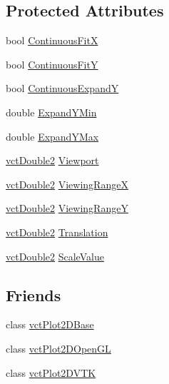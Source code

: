 \subsection*{Protected Attributes}
\begin{DoxyCompactItemize}
\item 
bool \hyperlink{classvct_plot2_d_base_1_1_scale_af427cb10aa8954351e39f21ad9b03b31}{Continuous\-Fit\-X}
\item 
bool \hyperlink{classvct_plot2_d_base_1_1_scale_a2458a3a97a0362e8abbb253bffaf1e02}{Continuous\-Fit\-Y}
\item 
bool \hyperlink{classvct_plot2_d_base_1_1_scale_a46c3d6f50988f6f4e9ca584b2162b79a}{Continuous\-Expand\-Y}
\item 
double \hyperlink{classvct_plot2_d_base_1_1_scale_a8c14c31f9f79bddb29f2e5708712e3ab}{Expand\-Y\-Min}
\item 
double \hyperlink{classvct_plot2_d_base_1_1_scale_a21b8fd5b223a8aacf1f0dffe9858c286}{Expand\-Y\-Max}
\item 
\hyperlink{vct_fixed_size_vector_types_8h_afc0fdcc41cbe8b043747612501610812}{vct\-Double2} \hyperlink{classvct_plot2_d_base_1_1_scale_a3ad0dc662565feaa26046ab15b40efb1}{Viewport}
\item 
\hyperlink{vct_fixed_size_vector_types_8h_afc0fdcc41cbe8b043747612501610812}{vct\-Double2} \hyperlink{classvct_plot2_d_base_1_1_scale_a9d017bf27e0f5cef7a916acb0c5b9638}{Viewing\-Range\-X}
\item 
\hyperlink{vct_fixed_size_vector_types_8h_afc0fdcc41cbe8b043747612501610812}{vct\-Double2} \hyperlink{classvct_plot2_d_base_1_1_scale_accd0d96ac002b90cabd39bcd3bcc4ee4}{Viewing\-Range\-Y}
\item 
\hyperlink{vct_fixed_size_vector_types_8h_afc0fdcc41cbe8b043747612501610812}{vct\-Double2} \hyperlink{classvct_plot2_d_base_1_1_scale_a3155819b99d706351348e96ab827665c}{Translation}
\item 
\hyperlink{vct_fixed_size_vector_types_8h_afc0fdcc41cbe8b043747612501610812}{vct\-Double2} \hyperlink{classvct_plot2_d_base_1_1_scale_ad947e7d58e45f838430c34d70c0ec401}{Scale\-Value}
\end{DoxyCompactItemize}
\subsection*{Friends}
\begin{DoxyCompactItemize}
\item 
class \hyperlink{classvct_plot2_d_base_1_1_scale_ab1e5a371f284a693f5624104a92ac684}{vct\-Plot2\-D\-Base}
\item 
class \hyperlink{classvct_plot2_d_base_1_1_scale_a2a04e9e21d2a68342a48b433ff25b7f7}{vct\-Plot2\-D\-Open\-G\-L}
\item 
class \hyperlink{classvct_plot2_d_base_1_1_scale_a61e8f9a436596e1195d2b34b7b5c6f2e}{vct\-Plot2\-D\-V\-T\-K}
\end{DoxyCompactItemize}


